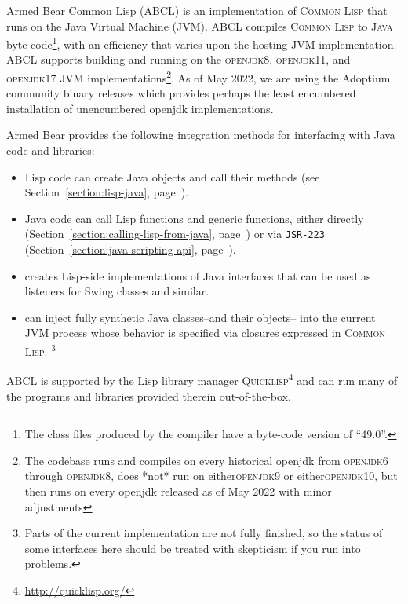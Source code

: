 \documentclass[10pt]{book}
\begin{document}
Armed Bear Common Lisp (\textsc{ABCL}) is an implementation of
\textsc{Common Lisp} that runs on the Java Virtual Machine
(\textsc{JVM}).  \textsc{ABCL} compiles \textsc{Common Lisp} to
\textsc{Java} byte-code\footnote{The class files produced by the
compiler have a byte-code version of ``49.0''.}, with an efficiency
that varies upon the hosting JVM implementation.  \textsc{ABCL}
supports building and running on the \textsc{openjdk8},
\textsc{openjdk11}, and \textsc{openjdk17} \textsc{JVM}
implementations\footnote{The codebase runs and compiles on every
historical openjdk from \textsc{openjdk6} through \textsc{openjdk8},
does *not* run on either\textsc{openjdk9} or either\textsc{openjdk10},
but then runs on every openjdk released as of May 2022 with minor
adjustments}.  As of May 2022, we are using the Adoptium community
\cite{adoptium} binary releases which provides perhaps the least
encumbered installation of unencumbered openjdk implementations.

Armed Bear provides the following integration methods for interfacing
with Java code and libraries:
\begin{itemize}
\item Lisp code can create Java objects and call their methods (see
  Section~\ref{section:lisp-java}, page~\pageref{section:lisp-java}).
\item Java code can call Lisp functions and generic functions, either
  directly (Section~\ref{section:calling-lisp-from-java},
  page~\pageref{section:calling-lisp-from-java}) or via \texttt{JSR-223}
  (Section~\ref{section:java-scripting-api},
  page~\pageref{section:java-scripting-api}).
\item {} creates Lisp-side implementations
  of Java interfaces that can be used as listeners for Swing classes and
  similar.
\item {} can inject fully synthetic Java
  classes--and their objects-- into the current JVM process whose
  behavior is specified via closures expressed in \textsc{Common
    Lisp}. \footnote{Parts of the current implementation are not fully
    finished, so the status of some interfaces here should be treated
    with skepticism if you run into problems.}

\end{itemize}
\textsc{ABCL} is supported by the Lisp library manager
\textsc{Quicklisp}\footnote{\url{http://quicklisp.org/}} and can run many of the
programs and libraries provided therein out-of-the-box.
\end{document}
